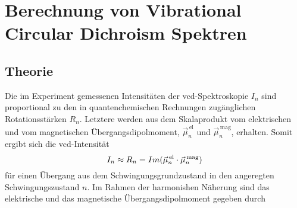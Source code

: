 \section{Berechnung von Vibrational Circular Dichroism Spektren}
	\subsection{Theorie}
	Die im Experiment gemessenen Intensitäten der \ac{vcd}-Spektroskopie $I_n$ sind proportional zu den in quantenchemischen Rechnungen zugänglichen Rotationsstärken $R_n$. Letztere werden aus dem Skalaprodukt vom elektrischen und vom magnetischen Übergangsdipolmoment, $\vec{\mu}_n^{\,\text{el}}$ und $\vec{\mu}_n^{\,\text{mag}}$,  erhalten. Somit ergibt sich die \ac{vcd}-Intensität
	\begin{equation}\label{eq:rotationsstaerke}
	  I_n\approx R_n = Im(\vec{\mu}_n^{\,\text{el}}\cdot\vec{\mu}_n^{\text{\,mag}})
	\end{equation}
	für einen Übergang aus dem Schwingungsgrundzustand in den angeregten Schwingungszustand $n$.\supercite{stephens1985theory,stephens1985vibrational} Im Rahmen der harmonishen Näherung sind das elektrische und das magnetische Übergangsdipolmoment gegeben durch\supercite{cheeseman1996ab,nicu2008vibrational}
	
